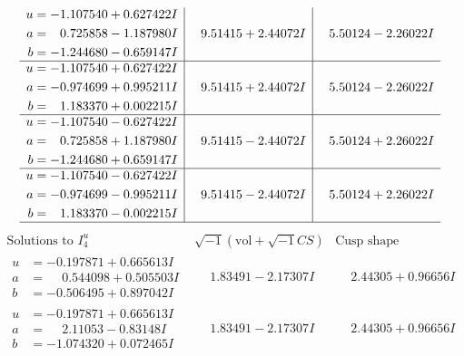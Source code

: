\documentclass[1p]{elsarticle_modified}
\theoremstyle{definition}
\newcommand{\I}{\sqrt{-1}}
\begin{document}
$$\begin{array}{c|c|c}
\begin{aligned}
u &= -1.107540 + 0.627422 I \\
a &= \phantom{-}0.725858 - 1.187980 I \\
b &= -1.244680 - 0.659147 I\end{aligned}
 & \phantom{-}9.51415 + 2.44072 I & \phantom{-}5.50124 - 2.26022 I \\ \hline\begin{aligned}
u &= -1.107540 + 0.627422 I \\
a &= -0.974699 + 0.995211 I \\
b &= \phantom{-}1.183370 + 0.002215 I\end{aligned}
 & \phantom{-}9.51415 + 2.44072 I & \phantom{-}5.50124 - 2.26022 I \\ \hline\begin{aligned}
u &= -1.107540 - 0.627422 I \\
a &= \phantom{-}0.725858 + 1.187980 I \\
b &= -1.244680 + 0.659147 I\end{aligned}
 & \phantom{-}9.51415 - 2.44072 I & \phantom{-}5.50124 + 2.26022 I \\ \hline\begin{aligned}
u &= -1.107540 - 0.627422 I \\
a &= -0.974699 - 0.995211 I \\
b &= \phantom{-}1.183370 - 0.002215 I\end{aligned}
 & \phantom{-}9.51415 - 2.44072 I & \phantom{-}5.50124 + 2.26022 I\\
 \hline 
 \end{array}$$\newpage$$\begin{array}{c|c|c}  
\text{Solutions to }I^u_{4}& \I (\text{vol} + \sqrt{-1}CS) & \text{Cusp shape}\\
 \hline 
\begin{aligned}
u &= -0.197871 + 0.665613 I \\
a &= \phantom{-}0.544098 + 0.505503 I \\
b &= -0.506495 + 0.897042 I\end{aligned}
 & \phantom{-}1.83491 - 2.17307 I & \phantom{-}2.44305 + 0.96656 I \\ \hline\begin{aligned}
u &= -0.197871 + 0.665613 I \\
a &= \phantom{-}2.11053 - 0.83148 I \\
b &= -1.074320 + 0.072465 I\end{aligned}
 & \phantom{-}1.83491 - 2.17307 I & \phantom{-}2.44305 + 0.96656 I \\ \hline\begin{aligned}

\end{aligned}
\end{array}$$
\end{document}
